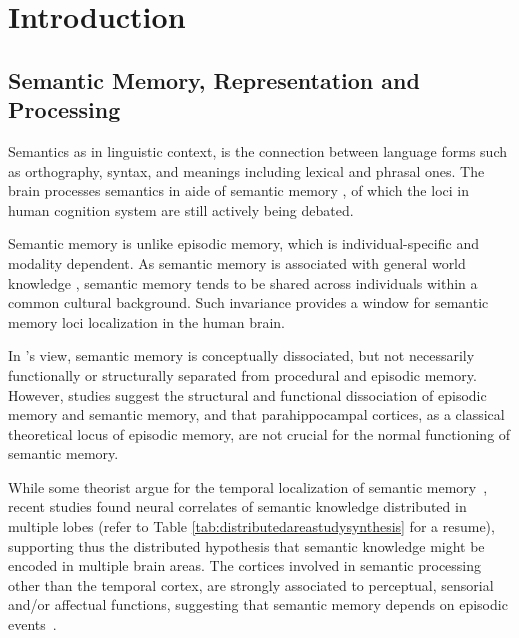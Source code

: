 \chapter{Introduction} 

\label{chap:introduction} 

\section{Semantic Memory, Representation and Processing} 

Semantics as in linguistic context, is the connection between language forms such as orthography, syntax, and meanings including lexical and phrasal ones. The brain processes semantics in aide of semantic memory \parencite{tulvingEpisodicSemanticMemory1972}, of which the loci in human cognition system are still actively being debated. 

Semantic memory is unlike episodic memory, which is individual-specific and modality dependent. As semantic memory is associated with general world knowledge \parencite{mcraeSemanticMemory2013}, semantic memory tends to be shared across individuals within a common cultural background. Such invariance provides a window for semantic memory loci localization in the human brain. 

In \citeauthor{tulvingEpisodicSemanticMemory1972}'s view, semantic memory is conceptually dissociated, but not necessarily functionally or structurally separated from procedural and episodic memory. However, studies \parencite{vargha-khademDifferentialEffectsEarly1997} suggest the structural and functional dissociation of episodic memory and semantic memory, and that parahippocampal cortices, as a classical theoretical locus of episodic memory, are not crucial for the normal functioning of semantic memory.
    

While some theorist argue for the temporal localization of semantic memory~\parencite{saumierSemanticMemory2002, martinSemanticMemoryBrain2001}, recent studies found neural correlates of semantic knowledge distributed in multiple lobes (refer to Table \ref{tab:distributedareastudysynthesis} for a resume), supporting thus the distributed hypothesis that semantic knowledge might be encoded in multiple brain areas. The cortices involved in semantic processing other than the temporal cortex, are strongly associated to perceptual, sensorial and\slash or affectual functions, suggesting that semantic memory depends on episodic events~\parencite{moseleyNounsVerbsObjects2014}. 

